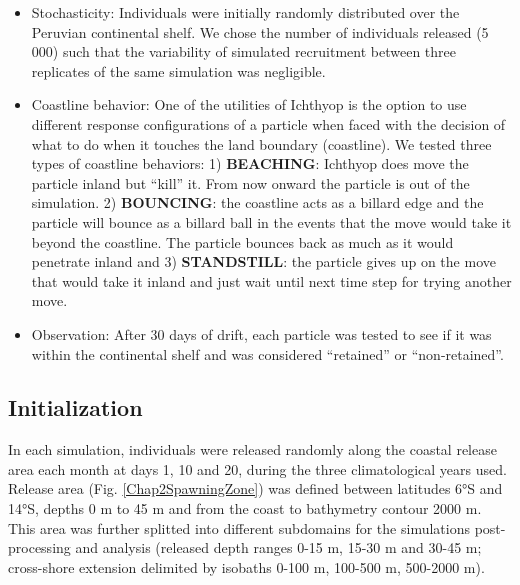 \begin{itemize}

\item Stochasticity: Individuals were initially randomly distributed over the Peruvian continental shelf. We chose the number of individuals released (5 000) such that the variability of simulated recruitment between three replicates of the same simulation was negligible.\\

\item Coastline behavior: One of the utilities of Ichthyop is the option to use different response configurations of a particle when faced with the decision of what to do when it touches the land boundary (coastline). We tested three types of coastline behaviors: 1) \textbf{BEACHING}: Ichthyop does move the particle inland but ``kill'' it. From now onward the particle is out of the simulation. 2) \textbf{BOUNCING}: the coastline acts as a billard edge and the particle will bounce as a billard ball in the events that the move would take it beyond the coastline. The particle bounces back as much as it would penetrate inland and 3) \textbf{STANDSTILL}: the particle gives up on the move that would take it inland and just wait until next time step for trying another move.\\

\item Observation: After 30 days of drift, each particle was tested to see if it was within the continental shelf and was considered ``retained'' or ``non-retained''.\\

\end{itemize}

\subsection{Initialization}\label{Chap2MethInit}

In each simulation, individuals were released randomly along the coastal release area each month at days 1, 10 and 20, during the three climatological years used.\\

Release area (Fig. \ref{Chap2SpawningZone}) was defined between latitudes 6°S and 14°S, depths 0 m to 45 m and from the coast to bathymetry contour 2000 m. This area was further splitted into different subdomains for the simulations post-processing and analysis (released depth ranges 0-15 m, 15-30 m and 30-45 m; cross-shore extension delimited by isobaths 0-100 m, 100-500 m, 500-2000 m).\\

